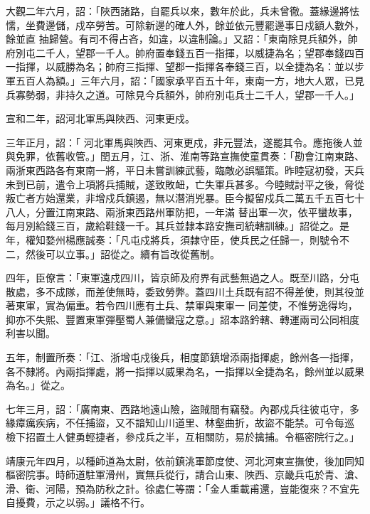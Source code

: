\begin{pinyinscope}
 大觀二年六月，詔：「陜西諸路，自罷兵以來，數年於此，兵未曾徹。蓋緣邊將怯懦，坐費邊儲，戍卒勞苦。可除新邊的確人外，餘並依元豐罷邊事日戍額人數外，餘並直
 抽歸營。有司不得占吝，如違，以違制論。」又詔：「東南除見兵額外，帥府別屯二千人，望郡一千人。帥府置奉錢五百一指揮，以威捷為名；望郡奉錢四百一指揮，以威勝為名；帥府三指揮、望郡一指揮各奉錢三百，以全捷為名：並以步軍五百人為額。」三年六月，詔：「國家承平百五十年，東南一方，地大人眾，已見兵寡勢弱，非持久之道。可除見今兵額外，帥府別屯兵士二千人，望郡一千人。」



 宣和二年，詔河北軍馬與陜西、河東更戍。



 三年正月，詔：「
 河北軍馬與陜西、河東更戍，非元豐法，遂罷其令。應拖後人並與免罪，依舊收管。」閏五月，江、浙、淮南等路宣撫使童貫奏：「勘會江南東路、兩浙東西路各有東南一將，平日未嘗訓練武藝，臨敵必誤驅策。昨睦寇初發，天兵未到已前，遣令上項將兵捕賊，遂致敗衄，亡失軍兵甚多。今睦賊討平之後，脅從叛亡者方始還業，非增戍兵鎮遏，無以潛消兇暴。臣今擬留戍兵二萬五千五百七十八人，分置江南東路、兩浙東西路州軍防把，一年滿
 替出軍一次，依平蠻故事，每月別給錢三百，歲給鞋錢一千。其兵並隸本路安撫司統轄訓練。」詔從之。是年，權知婺州楊應誠奏：「凡屯戍將兵，須隸守臣，使兵民之任歸一，則號令不二，然後可以立事。」詔從之。續有旨改從舊制。



 四年，臣僚言：「東軍遠戍四川，皆京師及府界有武藝無過之人。既至川路，分屯散處，多不成隊，而差使無時，委致勞弊。蓋四川土兵既有詔不得差使，則其役並著東軍，實為偏重。若令四川應有土兵、禁軍與東軍一
 同差使，不惟勞逸得均，抑亦不失熙、豐置東軍彈壓蜀人兼備蠻寇之意。」詔本路鈐轄、轉運兩司公同相度利害以聞。



 五年，制置所奏：「江、浙增屯戍後兵，相度節鎮增添兩指揮處，餘州各一指揮，各不隸將。內兩指揮處，將一指揮以威果為名，一指揮以全捷為名，餘州並以威果為名。」從之。



 七年三月，詔：「廣南東、西路地遠山險，盜賊間有竊發。內郡戍兵往彼屯守，多緣瘴癘疾病，不任捕盜，又不諳知山川道里、林壑曲折，故盜不能禁。可令每巡
 檢下招置土人健勇輕捷者，參戍兵之半，互相關防，易於擒捕。令樞密院行之。」



 靖康元年四月，以種師道為太尉，依前鎮洮軍節度使、河北河東宣撫使，後加同知樞密院事。時師道駐軍滑州，實無兵從行，請合山東、陜西、京畿兵屯於青、滄、滑、衛、河陽，預為防秋之計。徐處仁等謂：「金人重載甫還，豈能復來？不宜先自擾費，示之以弱。」議格不行。




\end{pinyinscope}
